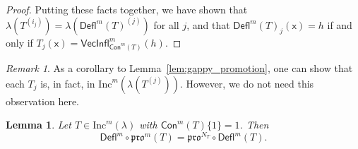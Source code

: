 \documentclass[12pt]{amsart}
\newcommand{\x}{\ensuremath{\mathsf{x}}}
\newtheorem{lemma}[theorem]{Lemma}
\theoremstyle{definition}
\theoremstyle{remark}
\newtheorem{remark}[theorem]{Remark}
\numberwithin{equation}{section}
\newcommand{\inc}{\ensuremath{\mathrm{Inc}}}
\newcommand{\pro}{\mathfrak{pro}}
\newcommand{\deflate}{\ensuremath{\mathsf{Defl}}}
\newcommand{\inflate}{\ensuremath{\mathsf{VecInfl}}}
\newcommand{\content}{\ensuremath{\mathsf{Con}}}
\begin{document}
\begin{proof}
Putting these facts together, we have shown that $\lambda \left(T^{(i_j)} \right) = \lambda \left(\deflate^m(T)^{(j)} \right)$ for all $j$, and that $\deflate^m(T)_j(\x) = h$ if and only if $T_j(\x) = \inflate^m_{\content^m(T)}(h)$. 
\end{proof}

\begin{remark}
As a corollary to Lemma~\ref{lem:gappy_promotion}, one can show that each $T_j$ is, in fact, in $\inc^m \left(\lambda \left( T^{(j)} \right) \right)$. However, we do not need this observation here.
\end{remark}

\begin{lemma}\label{lem:deflation_commutation}
Let $T \in \inc^m(\lambda)$ with $\content^m(T) \lbrace 1 \rbrace = 1$. Then
\begin{equation}\label{eq:deflation_commutation}
\deflate^m \circ \pro^m(T) = \pro^{N_T} \circ \deflate^m(T).
\end{equation}

\end{lemma}
\end{document}
